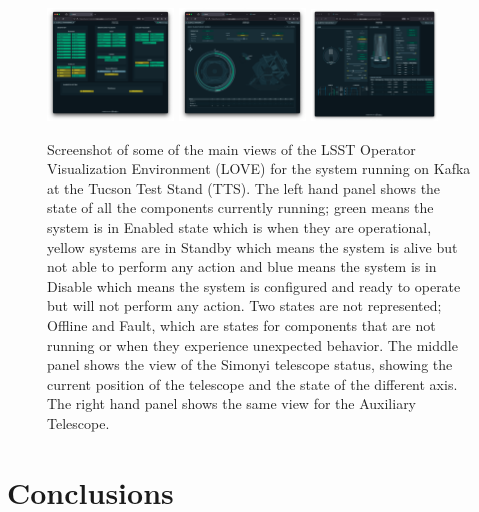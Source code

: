 \documentclass[]{spie}  %
\begin{document}
\begin{figure}[h]
  \centering
  \includegraphics[width=0.3\textwidth]{figures/swd1.png}
  \includegraphics[width=0.3\textwidth]{figures/swd2.png}
  \includegraphics[width=0.3\textwidth]{figures/swd3.png}
  \caption{
    Screenshot of some of the main views of the LSST Operator Visualization Environment (LOVE) for the system running on Kafka at the Tucson Test Stand (TTS).
    The left hand panel shows the state of all the components currently running; green means the system is in Enabled state which is when they are operational, yellow systems are in Standby which means the system is alive but not able to perform any action and blue means the system is in Disable which means the system is configured and ready to operate but will not perform any action.
    Two states are not represented; Offline and Fault, which are states for components that are not running or when they experience unexpected behavior.
    The middle panel shows the view of the Simonyi telescope status, showing the current position of the telescope and the state of the different axis.
    The right hand panel shows the same view for the Auxiliary Telescope.
  }\label{fig:swd}
\end{figure}


\section{Conclusions}
\label{sec:conclusions}
\end{document}
